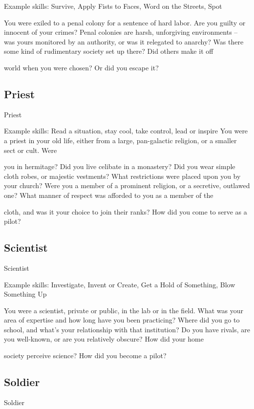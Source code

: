Example skills: Survive, Apply Fists to Faces, Word on the Streets, Spot
 

You were exiled to a penal colony for a sentence of hard labor. Are you guilty or innocent of your crimes?  
Penal colonies are harsh, unforgiving environments -- was yours monitored by an authority, or was it  
relegated to anarchy? Was there some kind of rudimentary society set up there? Did others make it off  

world when you were chosen? Or did you escape it? 
 
\subsection{Priest}
                                                        Priest  

Example skills: Read a situation, stay cool, take control, lead or inspire  
You were a priest in your old life, either from a large, pan-galactic religion, or a smaller sect or cult. Were  

you in hermitage? Did you live celibate in a monastery? Did you wear simple cloth robes, or majestic  
vestments? What restrictions were placed upon you by your church? Were you a member of a prominent  
religion, or a secretive, outlawed one? What manner of respect was afforded to you as a member of the  

cloth, and was it your choice to join their ranks? How did you come to serve as a pilot?  

                                                                                                                      
\subsection{Scientist}

                                                     Scientist  

Example skills: Investigate, Invent or Create, Get a Hold of Something, Blow Something Up  

You were a scientist, private or public, in the lab or in the field. What was your area of expertise and how  
long have you been practicing? Where did you go to school, and what’s your relationship with that  
institution? Do you have rivals, are you well-known, or are you relatively obscure? How did your home  

society perceive science? How did you become a pilot?   
\subsection{Soldier}
                                                       Soldier  

